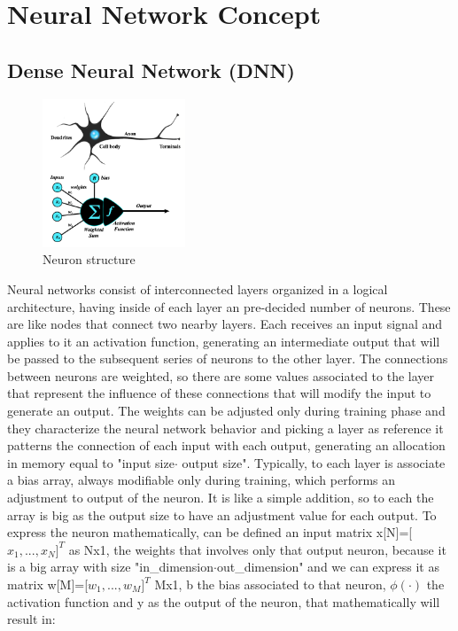 \section{Neural Network Concept}
\subsection{Dense Neural Network (DNN)}
\begin{figure}
  \begin{center}
    \includegraphics[width=0.38\textwidth]{images/2.04 Neuron.png}
  \end{center}
  \caption{Neuron structure}
\end{figure}
Neural networks consist of interconnected layers organized in a logical architecture, having inside of each layer an pre-decided number of neurons\cite{neural_network_theory}. These are like nodes that connect two nearby layers. Each receives an input signal and applies to it an activation function, generating an intermediate output that will be passed to the subsequent series of neurons to the other layer. The connections between neurons are weighted, so there are some values associated to the layer that represent the influence of these connections that will modify the input to generate an output. The weights can be adjusted only during training phase and they characterize the neural network behavior and picking a layer as reference it patterns the connection of each input with each output, generating an allocation in memory equal to "input size$\cdot$ output size". Typically, to each layer is associate a bias array, always modifiable only during training, which performs an adjustment to output of the neuron. It is like a simple addition, so to each the array is big as the output size to have an adjustment value for each output.\newline
To express the neuron mathematically, can be defined an input matrix x[N]=[$x_1,...,x_N$$]^T$ as
Nx1, the weights that involves only that output neuron, because it is a big array with size "in\_dimension$\cdot$out\_dimension" and we can express it as matrix w[M]=[$w_1,...,w_M$$]^T$  Mx1, b the bias associated to that neuron, $\phi(\cdot)$ the activation function and y as the output of the neuron, that mathematically will result in:
